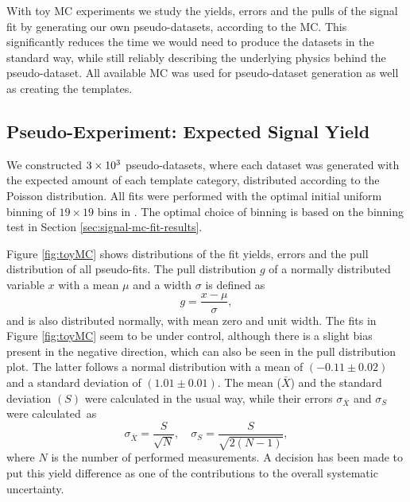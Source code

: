 With toy MC experiments we study the yields, errors and the pulls of the signal fit by generating our own pseudo-datasets, according to the MC. This significantly reduces the time we would need to produce the datasets in the standard way, while still reliably describing the underlying physics behind the pseudo-dataset. All available MC was used for pseudo-dataset generation as well as creating the templates. 

\subsection{Pseudo-Experiment: Expected Signal Yield}

We constructed $3\times 10^{3}$ pseudo-datasets, where each dataset was generated with the expected amount of each template category, distributed according to the Poisson distribution. All fits were performed with the optimal initial uniform binning of $19 \times 19$ bins in \vars. The optimal choice of binning is based on the binning test in Section \ref{sec:signal-mc-fit-results}.

Figure \ref{fig:toyMC} shows distributions of the fit yields, errors and the pull distribution of all pseudo-fits. The pull distribution $g$ of a normally distributed variable $x$ with a mean $\mu$ and a width $\sigma$ is defined as 
\begin{equation}
g = \frac{x-\mu}{\sigma},
\end{equation}
and is also distributed normally, with mean zero and unit width. The fits in Figure \ref{fig:toyMC} seem to be under control, although there is a slight bias present in the negative direction, which can also be seen in the pull distribution plot. The latter follows a normal distribution with a mean of $(-0.11\pm0.02)$ and a standard deviation of $(1.01\pm0.01)$. The mean ($\bar X$) and the standard deviation $(S)$ were calculated in the usual way, while their errors $\sigma_{\bar X}$ and $\sigma_S$ were calculated~as~\cite{ahn2003standard}
\begin{equation}
\sigma_{\bar X} = \frac{S}{\sqrt{N}},\quad \sigma_{S} = \frac{S}{\sqrt{2(N-1)}},
\end{equation}
where $N$ is the number of performed measurements. A decision has been made to put this yield difference as one of the contributions to the overall systematic uncertainty.

